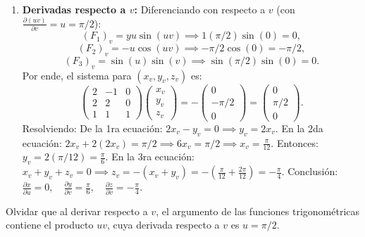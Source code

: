 \documentclass[11pt,a4paper]{article}
\begin{document}
\begin{enumerate}[label=\textbf{\arabic*.}]
\item \textbf{Derivadas respecto a $v$:}
Diferenciando con respecto a $v$ (con $\frac{\partial(uv)}{\partial v} = u = \pi/2$):
\begin{equation*}
(F_1)_v = y u \sin(uv) \implies 1(\pi/2)\sin(0) = 0,
\end{equation*}
\begin{equation*}
(F_2)_v = -u \cos(uv) \implies -\pi/2 \cos(0) = -\pi/2,
\end{equation*}
\begin{equation*}
(F_3)_v = \sin(u)\sin(v) \implies \sin(\pi/2)\sin(0) = 0.
\end{equation*}
Por ende, el sistema para $(x_v, y_v, z_v)$ es:
\begin{equation*}
\begin{pmatrix} 2 & -1 & 0 \\ 2 & 2 & 0 \\ 1 & 1 & 1 \end{pmatrix} \begin{pmatrix} x_v \\ y_v \\ z_v \end{pmatrix} = - \begin{pmatrix} 0 \\ -\pi/2 \\ 0 \end{pmatrix} = \begin{pmatrix} 0 \\ \pi/2 \\ 0 \end{pmatrix}.
\end{equation*}
Resolviendo:
De la 1ra ecuación: $2x_v - y_v = 0 \implies y_v = 2x_v$.
En la 2da ecuación: $2x_v + 2(2x_v) = \pi/2 \implies 6x_v = \pi/2 \implies x_v = \frac{\pi}{12}$.
Entonces: $y_v = 2(\pi/12) = \frac{\pi}{6}$.
En la 3ra ecuación: $x_v + y_v + z_v = 0 \implies z_v = -(x_v + y_v) = -\left(\frac{\pi}{12} + \frac{2\pi}{12}\right) = -\frac{\pi}{4}$.
Conclusión: $\frac{\partial x}{\partial u} = 0, \quad \frac{\partial y}{\partial v} = \frac{\pi}{6}, \quad \frac{\partial z}{\partial v} = -\frac{\pi}{4}$.
\end{enumerate}

\begin{trapbox}
Olvidar que al derivar respecto a $v$, el argumento de las funciones trigonométricas contiene el producto $uv$, cuya derivada respecto a $v$ es $u = \pi/2$.
\end{trapbox}
\end{document}
